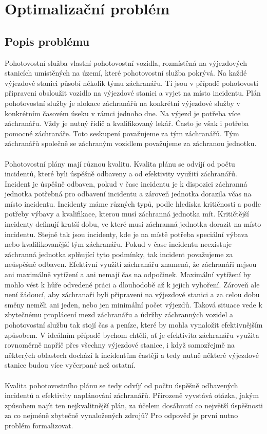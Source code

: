 \chapter{Optimalizační problém}

\section{Popis problému}

Pohotovostní služba vlastní pohotovostní vozidla, rozmístěná na výjezdových stanicích umístěných na území, které pohotovostní služba pokrývá.
Na každé výjezdové stanici působí několik týmu záchranářu. Ti jsou v případě pohotovosti připraveni obsloužit vozidlo na výjezdové stanici a vyjet na místo incidentu.
Plán pohotovostní služby je alokace záchranářů na konkrétní výjezdové služby v konkrétním časovém úseku v rámci jednoho dne.
Na výjezd je potřeba více záchranářu. Vždy je nutný řidič a kvalifikovaný lekář. Často je však i potřeba pomocné záchranáře.
Toto seskupení považujeme za tým záchranářů.
Tým záchranářů společně se záchraným vozidlem považujeme za záchranou jednotku.
\\\\
Pohotovostní plány mají různou kvalitu. Kvalita plánu se odvíjí od počtu incidentů, které byli úspěšně odbaveny a od efektivity využití záchranářů.
Incident je úspěšně odbaven, pokud v čase incidentu je k dispozici záchranná jednotka potřebná pro odbavení incidentu a zároveň jednotka dorazila včas na místo incidentu.
Incidenty máme různých typů, podle hlediska kritičnosti a podle potřeby výbavy a kvalifikace, kterou musí záchranná jednotka mít. 
Kritičtější incidenty definují kratší dobu, ve které musí záchranná jednotka dorazit na místo incidentu.
Stejně tak jsou incidenty, kde je na místě potřeba speciální výbava nebo kvalifikovanější tým záchranářu.
Pokud v čase incidentu neexistuje záchranná jednotka splňující tyto podmínky, tak incident považujeme za neúspěšně odbaven.
Efektivní využití záchranářu znamená, že záchranáři nejsou ani maximálně vytížení a ani nemají čas na odpočinek.
Maximální vytížení by mohlo vést k hůře odvedené práci a dlouhodobě až k jejich vyhoření.
Zároveň ale není žádoucí, aby záchranaři byli připraveni na výjezdové stanici a za celou dobu směny neměli ani jeden, nebo jen minimální počet výjezdů.
Taková situace vede k zbytečnému proplácení mezd záchranářu a údržby záchranných vozidel a pohotovostní službu tak stojí čas a peníze, které by mohla vynaložit efektivnějším způsobem.
V ideálním případě bychom chtěli, ať je efektivita záchranářu využita rovnoměrně napříč přes všechny výjezdové stanice, i když samozřejmě na některých oblastech dochází
k incidentům častěji a tedy nutně některé výjezdové stanice budou více vyčerpané než ostatní.
\\\\
Kvalita pohotovostního plánu se tedy odvíjí od počtu úspěšně odbavených incidentů a efektivity naplánování záchranářů.
Přirozeně vyvstává otázka, jakým způsobem najít ten nejkvalitnější plán, za účelem dosáhnutí co největší úspěšnosti za co nejméně zbytečně vynaložených zdrojů? 
Pro odpověď je první nutno problém formalizovat.

